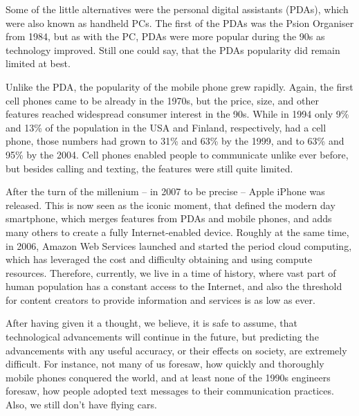 \documentclass[a4paper,12pt]{article}
\begin{document}
Some of the little alternatives were the personal digital assistants (PDAs), which were also known as handheld PCs. The first of the PDAs was the Psion Organiser from 1984, but as with the PC, PDAs were more popular during the 90s as technology improved. Still one could say, that the PDAs popularity did remain limited at best.

Unlike the PDA, the popularity of the mobile phone grew rapidly. Again, the first cell phones came to be already in the 1970s, but the price, size, and other features reached widespread consumer interest in the 90s. While in 1994 only 9\% and 13\% of the population in the USA and Finland, respectively, had a cell phone, those numbers had grown to 31\% and 63\% by the 1999, and to 63\% and 95\% by the 2004\cite{sy15}. Cell phones enabled people to communicate unlike ever before, but besides calling and texting, the features were still quite limited.

After the turn of the millenium -- in 2007 to be precise -- Apple iPhone was released. This is now seen as the iconic moment, that defined the modern day smartphone, which merges features from PDAs and mobile phones, and adds many others to create a fully Internet-enabled device. Roughly at the same time, in 2006, Amazon Web Services launched and started the period cloud computing, which has leveraged the cost and difficulty obtaining and using compute resources. Therefore, currently, we live in a time of history, where vast part of human population has a constant access to the Internet, and also the threshold for content creators to provide information and services is as low as ever.

After having given it a thought, we believe, it is safe to assume, that technological advancements will continue in the future, but predicting the advancements with any useful accuracy, or their effects on society, are extremely difficult. For instance, not many of us foresaw, how quickly and thoroughly mobile phones conquered the world, and at least none of the 1990s engineers foresaw, how people adopted text messages to their communication practices. Also, we still don't have flying cars.

\newpage
\end{document}
